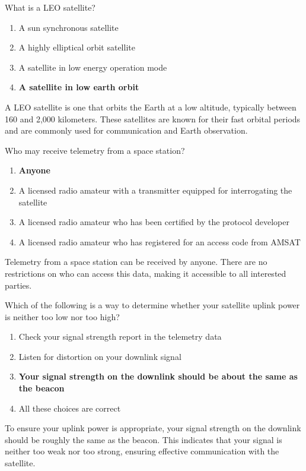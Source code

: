 \begin{tcolorbox}[colback=gray!10!white,colframe=black!75!black,title={T8B10}]
What is a LEO satellite?
\begin{enumerate}[label=\Alph*),noitemsep]
    \item A sun synchronous satellite
    \item A highly elliptical orbit satellite
    \item A satellite in low energy operation mode
    \item \textbf{A satellite in low earth orbit}
\end{enumerate}
\end{tcolorbox}
A LEO satellite is one that orbits the Earth at a low altitude, typically between 160 and 2,000 kilometers. These satellites are known for their fast orbital periods and are commonly used for communication and Earth observation.

\begin{tcolorbox}[colback=gray!10!white,colframe=black!75!black,title={T8B11}]
Who may receive telemetry from a space station?
\begin{enumerate}[label=\Alph*),noitemsep]
    \item \textbf{Anyone}
    \item A licensed radio amateur with a transmitter equipped for interrogating the satellite
    \item A licensed radio amateur who has been certified by the protocol developer
    \item A licensed radio amateur who has registered for an access code from AMSAT
\end{enumerate}
\end{tcolorbox}
Telemetry from a space station can be received by anyone. There are no restrictions on who can access this data, making it accessible to all interested parties.

\begin{tcolorbox}[colback=gray!10!white,colframe=black!75!black,title={T8B12}]
Which of the following is a way to determine whether your satellite uplink power is neither too low nor too high?
\begin{enumerate}[label=\Alph*),noitemsep]
    \item Check your signal strength report in the telemetry data
    \item Listen for distortion on your downlink signal
    \item \textbf{Your signal strength on the downlink should be about the same as the beacon}
    \item All these choices are correct
\end{enumerate}
\end{tcolorbox}
To ensure your uplink power is appropriate, your signal strength on the downlink should be roughly the same as the beacon. This indicates that your signal is neither too weak nor too strong, ensuring effective communication with the satellite.
